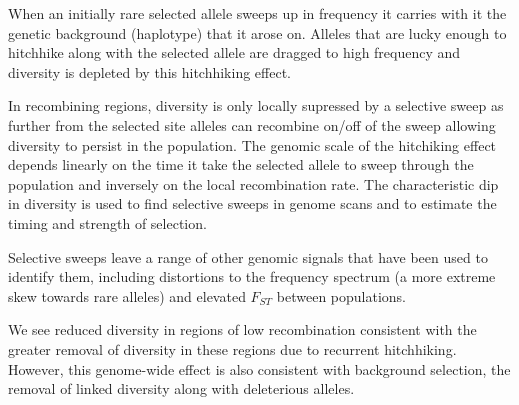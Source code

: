 \begin{ChapterSummary}
\item When an initially rare selected allele sweeps up in frequency it carries with it the genetic background (haplotype) that it arose on. Alleles that are lucky enough to hitchhike along with the
  selected allele are dragged to high frequency and diversity is depleted by this hitchhiking effect.
\item In recombining regions, diversity is only locally supressed by a selective sweep as further from the selected site alleles can recombine on/off of the sweep allowing diversity to persist in the population. The genomic scale of the hitchiking effect depends linearly on the time it take the selected allele to sweep through the population and inversely on the local recombination rate. The characteristic dip in diversity is used to find selective sweeps in genome scans and to estimate the timing and strength of selection. 
\item Selective sweeps leave a range of other genomic signals that have been used to identify them, including distortions to the frequency spectrum (a more extreme skew towards rare alleles) and elevated $F_{ST}$ between populations.
\item We see reduced diversity in regions of low recombination consistent with the greater removal of diversity in these regions due to recurrent hitchhiking. However, this genome-wide effect is also consistent with background selection, the removal of linked diversity along with deleterious alleles. 

\end{ChapterSummary}

